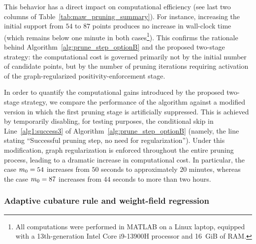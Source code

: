 \documentclass[preprint,10pt]{elsarticle}  %
\newcommand{\PROMPT}[1]{ }
\begin{document}
 This behavior has a direct impact on computational efficiency (see last two columns of Table~\ref{tab:maw_pruning_summary}). For instance,   increasing the initial support from $54$ to $87$ points produces   no increase in wall-clock time (which remains below one minute in both cases\footnote{All computations
were performed in MATLAB on a Linux laptop,
equipped with a 13th-generation Intel Core i9-13900H processor and
16~GiB of RAM.}). This confirms the rationale behind Algorithm~\ref{alg:prune_step_optionB} and the proposed two-stage strategy: the computational cost is governed primarily not by the initial number of candidate points, but by the number of pruning iterations requiring activation of the graph-regularized positivity-enforcement stage.

In order to quantify the computational gains introduced by the proposed two-stage strategy, we compare the performance of the algorithm against a modified version in which the first pruning stage is artificially suppressed. This is achieved by temporarily disabling, for testing purposes, the conditional skip in Line~\ref{alg1:success3} of Algorithm~\ref{alg:prune_step_optionB} (namely, the line stating ``Successful pruning step, no need for regularization''). Under this modification, graph regularization is enforced throughout the entire pruning process, leading to a dramatic increase in computational cost.  In particular, the case $m_0 = 54$ increases from   $50$ seconds to approximately $20$ minutes, whereas the case $m_0 = 87$ increases from   $44$ seconds to more than two hours.

  \PROMPT{}



\subsubsection{Adaptive cubature rule and weight-field regression}
\label{subsec:num_char_adaptive_weights}
\end{document}
